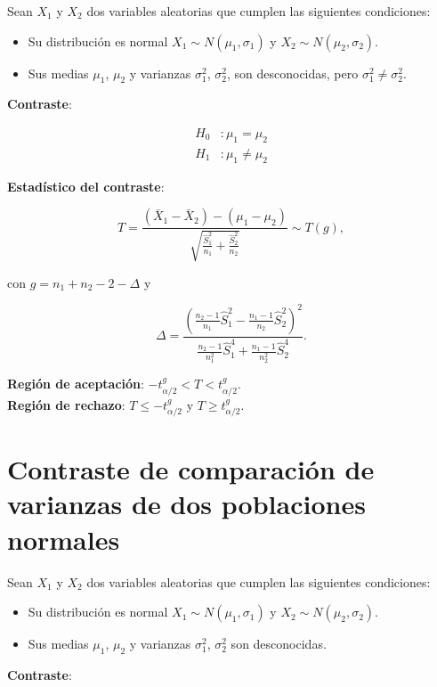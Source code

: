 \documentclass[
  a4paper,
]{scrreport}
\providecommand{\tightlist}{%
  \setlength{\itemsep}{0pt}\setlength{\parskip}{0pt}}\usepackage{longtable,booktabs,array}
\theoremstyle{plain}
\theoremstyle{definition}
\theoremstyle{definition}
\theoremstyle{remark}
\begin{document}
Sean \(X_1\) y \(X_2\) dos variables aleatorias que cumplen las
siguientes condiciones:

\begin{itemize}
\tightlist
\item
  Su distribución es normal \(X_1\sim N(\mu_1,\sigma_1)\) y
  \(X_2\sim N(\mu_2,\sigma_2)\).
\item
  Sus medias \(\mu_1\), \(\mu_2\) y varianzas \(\sigma_1^2\),
  \(\sigma_2^2\), son desconocidas, pero
  \(\sigma^2_1\not = \sigma^2_2\).
\end{itemize}

\textbf{Contraste}:

\begin{align*}
H_0 &: \mu_1=\mu_2 \\
H_1 &: \mu_1\neq \mu_2
\end{align*}

\textbf{Estadístico del contraste}:

\[
T=\frac{(\bar{X}_1-\bar{X}_2)-(\mu_1-\mu_2)}{\sqrt{\frac{\hat{S}^2_1}{n_1}+\frac{\hat{S}^2_2}{n_2}}} \sim T(g),
\]

con \(g=n_1+n_2-2-\Delta\) y

\[\Delta = \frac{(\frac{n_2-1}{n_1}\hat{S}_1^2-\frac{n_1-1}{n_2}\hat{S}_2^2)^2}{\frac{n_2-1}{n_1^2}\hat{S}_1^4+\frac{n_1-1}{n_2^2}\hat{S}_2^4}.
\]

\textbf{Región de aceptación}:
\(-t_{\alpha/2}^{g} < T < t_{\alpha/2}^{g}\).\\
\textbf{Región de rechazo}: \(T\leq -t_{\alpha/2}^{g}\) y
\(T\geq t_{\alpha/2}^{g}\).

\section{Contraste de comparación de varianzas de dos poblaciones
normales}\label{contraste-de-comparaciuxf3n-de-varianzas-de-dos-poblaciones-normales}

Sean \(X_1\) y \(X_2\) dos variables aleatorias que cumplen las
siguientes condiciones:

\begin{itemize}
\tightlist
\item
  Su distribución es normal \(X_1\sim N(\mu_1,\sigma_1)\) y
  \(X_2\sim N(\mu_2,\sigma_2)\).
\item
  Sus medias \(\mu_1\), \(\mu_2\) y varianzas \(\sigma_1^2\),
  \(\sigma_2^2\) son desconocidas.
\end{itemize}

\textbf{Contraste}:
\end{document}

